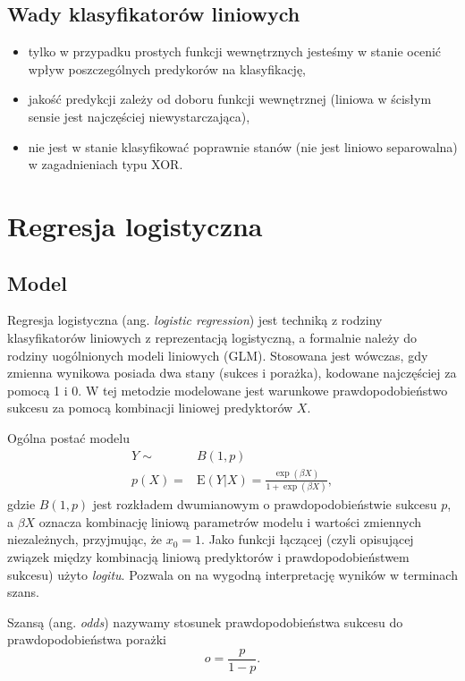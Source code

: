 \documentclass[
]{book}
\providecommand{\tightlist}{%
  \setlength{\itemsep}{0pt}\setlength{\parskip}{0pt}}
\newcommand{\E}{\mathrm{E}}
\theoremstyle{plain}
\theoremstyle{definition}
\theoremstyle{definition}
\theoremstyle{definition}
\theoremstyle{definition}
\theoremstyle{definition}
\theoremstyle{remark}
\begin{document}
\section{Wady klasyfikatorów liniowych}\label{wady-klasyfikatoruxf3w-liniowych}

\begin{itemize}
\tightlist
\item
  tylko w przypadku prostych funkcji wewnętrznych jesteśmy w stanie ocenić wpływ poszczególnych predykorów na klasyfikację,
\item
  jakość predykcji zależy od doboru funkcji wewnętrznej (liniowa w ścisłym sensie jest najczęściej niewystarczająca),
\item
  nie jest w stanie klasyfikować poprawnie stanów (nie jest liniowo separowalna) w zagadnieniach typu XOR.
\end{itemize}

\chapter{Regresja logistyczna}\label{regresja-logistyczna}

\section{Model}\label{model-1}

Regresja logistyczna (ang. \emph{logistic regression}) jest techniką z rodziny klasyfikatorów liniowych z reprezentacją logistyczną, a formalnie należy do rodziny uogólnionych modeli liniowych (GLM). Stosowana jest wówczas, gdy zmienna wynikowa posiada dwa stany (sukces i porażka), kodowane najczęściej za pomocą 1 i 0. W tej metodzie modelowane jest warunkowe prawdopodobieństwo sukcesu za pomocą kombinacji liniowej predyktorów \(X\).

Ogólna postać modelu
\begin{align}
    Y\sim &B(1, p)\\
    p(X)=&\E(Y|X)=\frac{\exp(\beta X)}{1+\exp(\beta X)},
\end{align}
gdzie \(B(1,p)\) jest rozkładem dwumianowym o prawdopodobieństwie sukcesu \(p\), a \(\beta X\) oznacza kombinację liniową parametrów modelu i wartości zmiennych niezależnych, przyjmując, że \(x_0=1\). Jako funkcji łączącej (czyli opisującej związek między kombinacją liniową predyktorów i prawdopodobieństwem sukcesu) użyto \emph{logitu}. Pozwala on na wygodną interpretację wyników w terminach szans.

Szansą (ang. \emph{odds}) nazywamy stosunek prawdopodobieństwa sukcesu do prawdopodobieństwa porażki
\begin{equation}
    o = \frac{p}{1-p}.
\end{equation}
\end{document}
